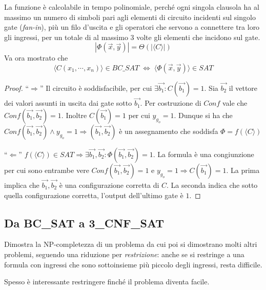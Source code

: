 La funzione è calcolabile in tempo polinomiale, perché ogni singola clausola ha al massimo un numero di simboli pari agli elementi di circuito incidenti sul singolo gate (\emph{fan-in}), più un filo d'uscita e gli operatori che servono a connettere tra loro gli ingressi, per un totale di al massimo 3 volte gli elementi che incidono sul gate. 
\begin{equation*}
    | \Phi \left( \vec{x}, \vec{y} \right) | = \Theta \left( |\langle C \rangle| \right)
\end{equation*}
Va ora mostrato che
\begin{equation*}
    \langle  C \left( x_1, \cdots, x_n \right)  \rangle \in BC\_SAT
    \;
    \Leftrightarrow
    \;
    \langle  \Phi \left( \vec{x}, \vec{y} \right)  \rangle \in SAT
\end{equation*}

\begin{proof}
    ``$\Rightarrow$''
    Il circuito è soddisfacibile, per cui $\exists \vec{b_1} : C ( \vec{b_1} ) = 1$.
    Sia $\vec{b_2}$ il vettore dei valori assunti in uscita dai gate sotto $\vec{b_1}$.
    Per costruzione di $Conf$ vale che $Conf ( \vec{b_1}, \vec{b_2} ) = 1$.
    Inoltre $C(\vec{b_1})=1$ per cui $y_{g_o}=1$.
    Dunque si ha che $Conf ( \vec{b_1}, \vec{b_2} ) \wedge y_{g_o} = 1 \Rightarrow ( \vec{b_1}, \vec{b_2} ) $ è un assegnamento che soddisfa $\Phi = f (\langle C \rangle)$

    ``$\Leftarrow$''
    $f(\langle C \rangle) \in SAT \Rightarrow \exists \vec{b_1}, \vec{b_2} : \Phi ( \vec{b_1}, \vec{b_2} ) = 1$.
    La formula è una congiunzione per cui sono entrambe vere $Conf( \vec{b_1}, \vec{b_2} ) = 1$ e $y_{g_o} = 1 \Rightarrow C( \vec{b_1} ) = 1$.
    La prima implica che $\vec{b_1}, \vec{b_2}$ è una configurazione corretta di $C$.
    La seconda indica che sotto quella configurazione corretta, l'output dell'ultimo gate è $1$.
\end{proof}

\subsection{Da BC\_SAT a 3\_CNF\_SAT}

Dimostra la NP-completezza di un problema da cui poi si dimostrano molti altri problemi, seguendo una riduzione per \emph{restrizione}: anche se si restringe a una formula con ingressi che sono sottoinsieme più piccolo degli ingressi, resta difficile.

Spesso è interessante restringere finché il problema diventa facile.

